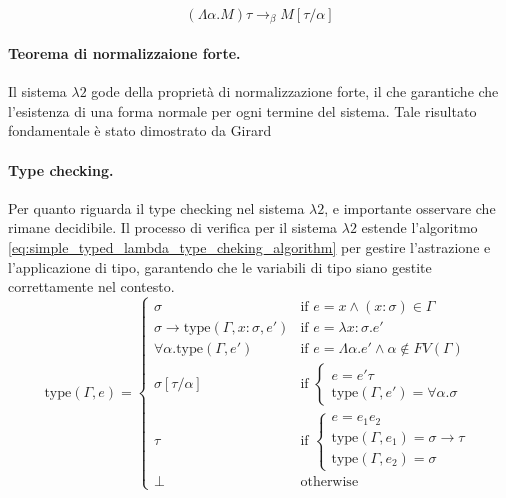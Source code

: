 \begin{equation}
    (\Lambda \alpha. M) \tau \to_\beta M[\tau / \alpha]
    \label{eq:system_f_beta_reduction}
\end{equation}

\paragraph{Teorema di normalizzaione forte.}
Il sistema $\lambda 2$ gode della proprietà di normalizzazione forte, il che garantiche che l'esistenza di una forma normale
per ogni termine del sistema. Tale risultato fondamentale è stato dimostrato da Girard \cite{Girard1989}

\paragraph{Type checking.}
Per quanto riguarda il type checking nel sistema $\lambda 2$, e importante osservare che rimane decidibile. Il processo 
di verifica per il sistema $\lambda 2$ estende l'algoritmo \eqref{eq:simple_typed_lambda_type_cheking_algorithm} per 
gestire l'astrazione e l'applicazione di tipo, garantendo che le variabili di tipo siano gestite correttamente nel contesto.
\begin{equation}
    \text{type}(\Gamma, e) = 
    \begin{cases} 
        \sigma & \text{if } e = x \land (x : \sigma) \in \Gamma \\
        \sigma \to \text{type}(\Gamma, x:\sigma, e') & \text{if } e = \lambda x : \sigma . e' \\
        \forall \alpha. \text{type}(\Gamma, e') & \text{if } e = \Lambda \alpha. e' \land \alpha \notin FV(\Gamma) \\
        \sigma[\tau/\alpha] & \text{if } 
            \begin{cases} 
                e = e' \tau \\ 
                \text{type}(\Gamma, e') = \forall \alpha. \sigma 
            \end{cases} \\
        \tau & \text{if } 
            \begin{cases} 
                e = e_1 e_2 \\ 
                \text{type}(\Gamma, e_1) = \sigma \to \tau \\ 
                \text{type}(\Gamma, e_2) = \sigma 
            \end{cases} \\
        \perp & \text{otherwise}
    \end{cases}
\end{equation}

